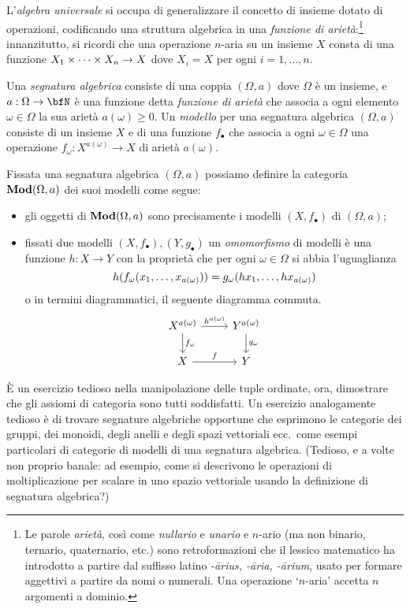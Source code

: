 L'\emph{algebra universale} si occupa di generalizzare il concetto di insieme dotato di operazioni, codificando una struttura algebrica in una \emph{funzione di arietà}:\footnote{Le parole \emph{arietà}, così come \emph{nullario} e \emph{unario} e \(n\)-ario (ma non binario, ternario, quaternario, etc.) sono retroformazioni che il lessico matematico ha introdotto a partire dal suffisso latino \emph{-\={a}rius, -\=aria, -\=arium}, usato per formare aggettivi a partire da nomi o numerali. Una operazione `\(n\)-aria' accetta \(n\) argomenti a dominio.} innanzitutto, si ricordi che una operazione \(n\)-aria su un insieme \(X\) consta di una funzione \(\tup Xn\times \to X\) dove \(X_i = X\) per ogni \(i=1,\dots,n\).
\begin{example}\label{ex_cat_sigma_strutture}
	Una \emph{segnatura algebrica} consiste di una coppia \((\Omega, a)\) dove \(\Omega\) è un insieme, e \(a : \Omega \to \bfN\) è una funzione detta \emph{funzione di arietà} che associa a ogni elemento \(\omega \in \Omega\) la sua arietà \(a(\omega)\ge 0\). Un \emph{modello} per una segnatura algebrica \((\Omega,a)\) consiste di un insieme \(X\) e di una funzione \(f_\bullet\) che associa a ogni \(\omega\in\Omega\) una operazione \(f_\omega : X^{a(\omega)} \to X\) di arietà \(a(\omega)\).

	Fissata una segnatura algebrica \((\Omega,a)\) possiamo definire la categoria \(\mathbf{Mod}(\Omega,a)\) dei suoi modelli come segue:
	\begin{itemize}
		\item gli oggetti di \(\mathbf{Mod}(\Omega,a)\) sono precisamente i modelli \((X,f_\bullet)\) di \((\Omega,a)\);
		\item fissati due modelli \((X,f_\bullet), (Y,g_\bullet)\) un \emph{omomorfismo} di modelli è una funzione \(h : X\to Y\) con la proprietà che per ogni \(\omega\in\Omega\) si abbia l'uguaglianza
		      \[h(f_\omega(\tup x{a(\omega)},)) = g_\omega(\tup {hx}{a(\omega)},)\]
		      o in termini diagrammatici, il seguente diagramma commuta.
		      \[
		      \begin{tikzcd}
		      	X^{a(\omega)} \ar{r}{h^{a(\omega)}} \ar{d}{f_\omega} & Y^{a(\omega)} \ar{d}{g_\omega} \\
		      	X \ar{r}{f} & Y
		      \end{tikzcd}
		      \]
	\end{itemize}
\end{example}
\`E un esercizio tedioso nella manipolazione delle tuple ordinate, ora, dimostrare che gli assiomi di categoria sono tutti soddisfatti. Un esercizio analogamente tedioso è di trovare segnature algebriche opportune che esprimono le categorie dei gruppi, dei monoidi, degli anelli e degli spazi vettoriali ecc.\ come esempi particolari di categorie di modelli di una segnatura algebrica. (Tedioso, e a volte non proprio banale: ad esempio, come si descrivono le operazioni di moltiplicazione per scalare in uno spazio vettoriale usando la definizione di segnatura algebrica?)
